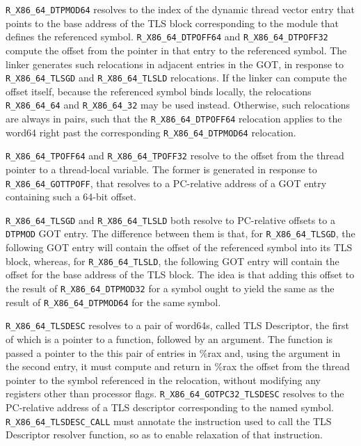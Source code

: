 \begin{sloppypar}
\texttt{R_X86_64_DTPMOD64} resolves to the index of the dynamic thread
vector entry that points to the base address of the TLS block
corresponding to the module that defines the referenced symbol.
\texttt{R_X86_64_DTPOFF64} and \texttt{R_X86_64_DTPOFF32} compute the
offset from the pointer in that entry to the referenced symbol.  The
linker generates such relocations in adjacent entries in the GOT, in
response to \texttt{R_X86_64_TLSGD} and \texttt{R_X86_64_TLSLD}
relocations.  If the linker can compute the offset itself, because the
referenced symbol binds locally, the relocations \texttt{R_X86_64_64} and \texttt{R_X86_64_32} may be used instead.
Otherwise, such relocations are always in pairs, such that the
\texttt{R_X86_64_DTPOFF64} relocation applies to the word64 right past the
corresponding \texttt{R_X86_64_DTPMOD64} relocation.
\end{sloppypar}

\texttt{R_X86_64_TPOFF64} and \texttt{R_X86_64_TPOFF32} resolve to the
offset from the thread pointer to a thread-local variable.  The former
is generated in response to \texttt{R_X86_64_GOTTPOFF}, that resolves
to a PC-relative address of a GOT entry containing such a 64-bit
offset.

\texttt{R_X86_64_TLSGD} and \texttt{R_X86_64_TLSLD} both resolve to
PC-relative offsets to a \texttt{DTPMOD} GOT entry.  The difference
between them is that, for \texttt{R_X86_64_TLSGD}, the following GOT entry will
contain the offset of the referenced symbol into its TLS block,
whereas, for \texttt{R_X86_64_TLSLD}, the following GOT entry will contain the
offset for the base address of the TLS block.  The idea is that adding
this offset to the result of \texttt{R_X86_64_DTPMOD32} for a symbol ought to
yield the same as the result of \texttt{R_X86_64_DTPMOD64} for the same symbol.

\texttt{R_X86_64_TLSDESC} resolves to a pair of word64s, called TLS
Descriptor, the first of which is a pointer to a function, followed by
an argument.  The function is passed a pointer to the this pair of
entries in \%rax and, using the argument in the second entry, it must
compute and return in \%rax the offset from the thread pointer to the
symbol referenced in the relocation, without modifying any registers
other than processor flags.  \texttt{R_X86_64_GOTPC32_TLSDESC}
resolves to the PC-relative address of a TLS descriptor corresponding
to the named symbol.  \texttt{R_X86_64_TLSDESC_CALL} must annotate the
instruction used to call the TLS Descriptor resolver function, so as
to enable relaxation of that instruction.

